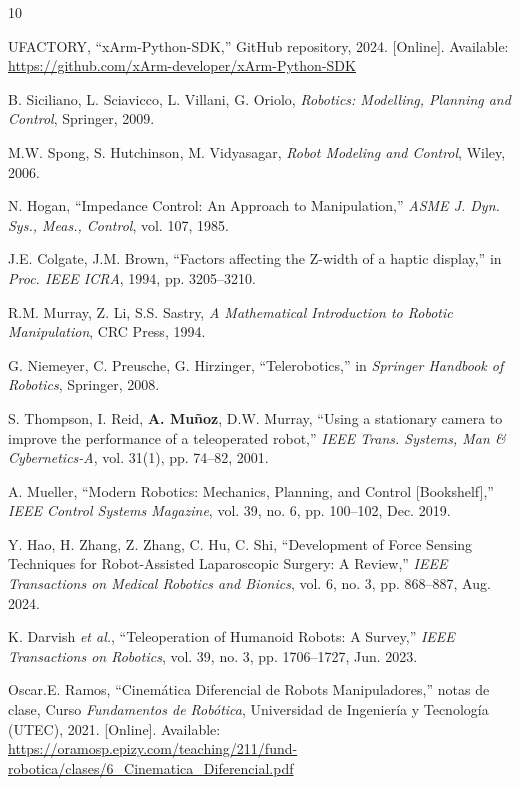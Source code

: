 \documentclass[journal,10pt,twoside]{IEEEtran}
\begin{document}
\begin{thebibliography}{10}

  UFACTORY, ``xArm-Python-SDK,''
  GitHub repository, 2024.
  [Online]. Available: \url{https://github.com/xArm-developer/xArm-Python-SDK}

  B. Siciliano, L. Sciavicco, L. Villani, G. Oriolo,
  \textit{Robotics: Modelling, Planning and Control},
  Springer, 2009.

  M.W. Spong, S. Hutchinson, M. Vidyasagar,
  \textit{Robot Modeling and Control},
  Wiley, 2006.

  N. Hogan,
  ``Impedance Control: An Approach to Manipulation,''
  \textit{ASME J. Dyn. Sys., Meas., Control},
  vol. 107, 1985.

  J.E. Colgate, J.M. Brown,
  ``Factors affecting the Z-width of a haptic display,''
  in \textit{Proc. IEEE ICRA}, 1994, pp. 3205--3210.

  R.M. Murray, Z. Li, S.S. Sastry,
  \textit{A Mathematical Introduction to Robotic Manipulation},
  CRC Press, 1994.

  G. Niemeyer, C. Preusche, G. Hirzinger,
  ``Telerobotics,''
  in \textit{Springer Handbook of Robotics},
  Springer, 2008.

  S. Thompson, I. Reid, \textbf{A. Muñoz}, D.W. Murray,
  ``Using a stationary camera to improve the performance
  of a teleoperated robot,''
  \textit{IEEE Trans. Systems, Man \& Cybernetics-A},
  vol. 31(1), pp. 74--82, 2001.

  A. Mueller,
  ``Modern Robotics: Mechanics, Planning, and Control [Bookshelf],''
  \textit{IEEE Control Systems Magazine},
  vol. 39, no. 6, pp. 100--102, Dec. 2019.

  Y. Hao, H. Zhang, Z. Zhang, C. Hu, C. Shi,
  ``Development of Force Sensing Techniques for Robot-Assisted Laparoscopic Surgery: A Review,''
  \textit{IEEE Transactions on Medical Robotics and Bionics},
  vol. 6, no. 3, pp. 868--887, Aug. 2024.

  K. Darvish \textit{et al.},
  ``Teleoperation of Humanoid Robots: A Survey,''
  \textit{IEEE Transactions on Robotics},
  vol. 39, no. 3, pp. 1706--1727, Jun. 2023.

  Oscar.E. Ramos,
  ``Cinemática Diferencial de Robots Manipuladores,''
  notas de clase, Curso \textit{Fundamentos de Robótica},
  Universidad de Ingeniería y Tecnología (UTEC), 2021.
  [Online]. Available: \url{https://oramosp.epizy.com/teaching/211/fund-robotica/clases/6_Cinematica_Diferencial.pdf}

\end{thebibliography}
\end{document}
